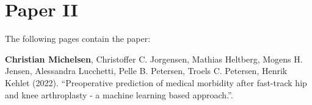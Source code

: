 \chapter{Paper II}
\label{chapter:hospital}

The following pages contain the paper:
\vspace*{1cm}


\textbf{Christian Michelsen}, Christoffer C. Jorgensen, Mathias Heltberg, Mogens H. Jensen, Alessandra Lucchetti, Pelle B. Petersen, Troels C. Petersen, Henrik Kehlet (2022). ``Preoperative prediction of medical morbidity after fast-track hip and knee arthroplasty - a machine learning based approach.''.


% 